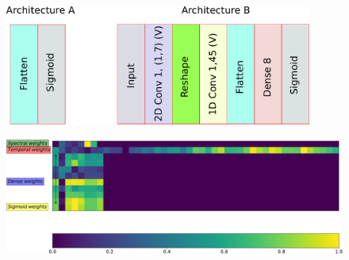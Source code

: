 \documentclass{article}
\begin{document}

\begin{figure}
\includegraphics[width=0.9\textwidth]{Architectures.pdf} 
\end{figure}

\begin{figure}
\includegraphics[width=1.0\textwidth]{weights-crop.pdf} 
\end{figure}
\end{document}
